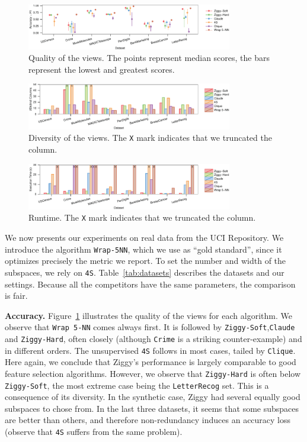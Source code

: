 \begin{figure}[!ht]
  \centering
  \includegraphics[width=0.8\textwidth]{Plots/Real-Accuracy}
  \caption{Quality of the views. The points represent median scores, the bars
  represent the lowest and greatest scores.}
  \label{pic:realquali}
\end{figure}
\begin{figure}[!ht]
  \centering
  \includegraphics[width=0.8\textwidth]{Plots/Real-Diversity}
  \caption{Diversity of the views. The \texttt{X} mark indicates that we 
  truncated the column.}
  \label{pic:realdiversity}
\end{figure}
\begin{figure}[!ht]
  \centering
  \includegraphics[width=0.8\textwidth]{Plots/Real-Runtime}
  \caption{Runtime. The \texttt{X} mark indicates that we truncated the column.}
  \label{pic:realruntime}
\end{figure}
We now presents our experiments on real data from the UCI Repository. We
introduce the algorithm \texttt{Wrap-5NN}, which we use as ``gold standard'',
since it optimizes precisely the metric we report. To set the number and width
of the subspaces, we rely on \texttt{4S}. Table~\ref{tab:datasets} describes the
datasets and our settings. Because all the competitors have the same
parameters, the comparison is fair.

\textbf{Accuracy.} Figure~\ref{pic:realquali} illustrates the quality of the
views for each algorithm. We observe that \texttt{Wrap 5-NN} comes always
first. It is followed by \texttt{Ziggy-Soft},\texttt{Claude} and
\texttt{Ziggy-Hard}, often closely (although \texttt{Crime} is a striking
counter-example) and in different orders. The unsupervised
\texttt{4S} follows in most cases, tailed by \texttt{Clique}. Here again, we
conclude that Ziggy's performance is largely comparable to good feature
selection algorithms. However, we observe that \texttt{Ziggy-Hard} is often
below \texttt{Ziggy-Soft}, the most extreme case being the \texttt{LetterRecog}
set.  This is a consequence of its diversity. In the synthetic case, Ziggy had
several equally good subspaces to chose from. In the last three datasets, it
seems that some subspaces are better than others, and therefore non-redundancy
induces an accuracy loss (observe that \texttt{4S} suffers from the same
problem).

